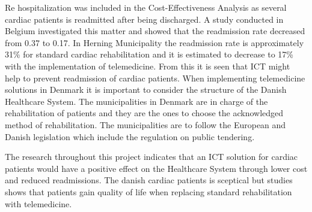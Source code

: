 Re hospitalization was included in the Cost-Effectiveness Analysis as several cardiac patients is readmitted after being discharged. A study conducted in Belgium investigated this matter and showed that the readmission rate decreased from 0.37 to 0.17. In Herning Municipality the readmission rate is approximately 31\% for standard cardiac rehabilitation and it is estimated to decrease to 17\% with the implementation of telemedicine.  From this it is seen that ICT might help to prevent readmission of cardiac patients. 
\newpage
When implementing telemedicine solutions in Denmark it is important to consider the structure of the Danish Healthcare System. The municipalities in Denmark are in charge of the rehabilitation of patients and they are the ones to choose the acknowledged method of rehabilitation. The municipalities are to follow the European and Danish legislation which include the regulation on public tendering. 

The research throughout this project indicates that an ICT solution for cardiac patients would have a positive effect on the Healthcare System through lower cost and reduced readmissions. The danish cardiac patients is sceptical but studies shows that patients gain quality of life when replacing standard rehabilitation with telemedicine.  



